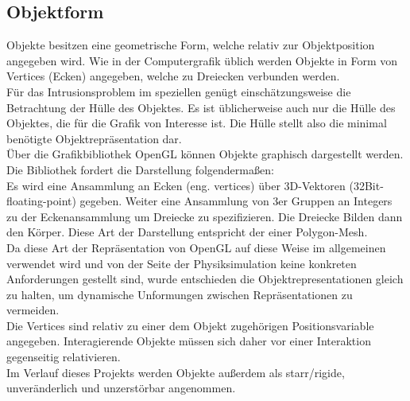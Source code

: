 \subsection{Objektform}
\label{sec:l0_objects}
Objekte besitzen eine geometrische Form, welche relativ zur Objektposition angegeben wird. 
Wie in der Computergrafik üblich werden Objekte in Form von Vertices (Ecken) angegeben, welche zu Dreiecken verbunden werden.\\
Für das Intrusionsproblem im speziellen genügt einschätzungsweise die Betrachtung der Hülle des Objektes. Es ist üblicherweise auch nur die Hülle des Objektes, die für die Grafik von Interesse ist. Die Hülle stellt also die minimal benötigte Objektrepräsentation dar.\\

Über die Grafikbibliothek OpenGL können Objekte graphisch dargestellt werden. Die Bibliothek fordert die Darstellung folgendermaßen:\\
Es wird eine Ansammlung an Ecken (eng. vertices) über 3D-Vektoren (32Bit-floating-point) gegeben. Weiter eine Ansammlung von 3er Gruppen an Integers zu der Eckenansammlung um Dreiecke zu spezifizieren. Die Dreiecke Bilden dann den Körper. Diese Art der Darstellung entspricht der einer Polygon-Mesh.\\
Da diese Art der Repräsentation von OpenGL auf diese Weise im allgemeinen verwendet wird und von der Seite der Physiksimulation keine konkreten Anforderungen gestellt sind, wurde entschieden die Objektrepresentationen gleich zu halten, um dynamische Unformungen zwischen Repräsentationen zu vermeiden.\\
Die Vertices sind relativ zu einer dem Objekt zugehörigen Positionsvariable angegeben. Interagierende Objekte müssen sich daher vor einer Interaktion gegenseitig relativieren.\\

Im Verlauf dieses Projekts werden Objekte außerdem als starr/rigide, unveränderlich und unzerstörbar angenommen.
	

